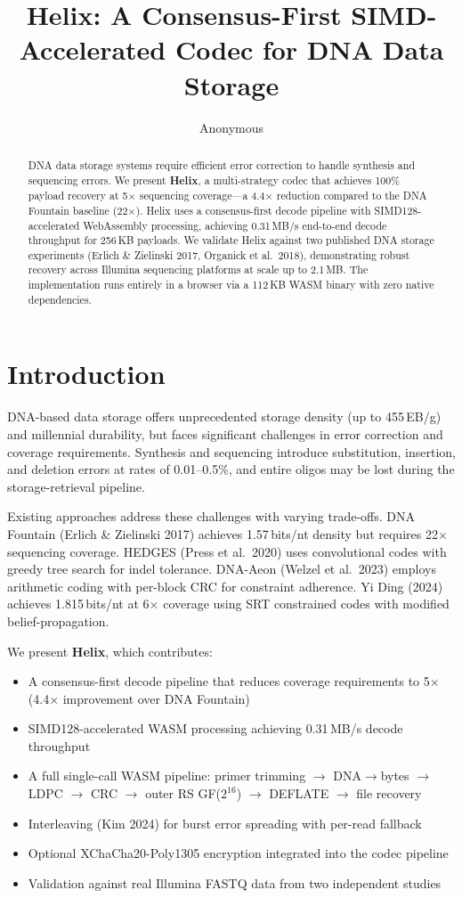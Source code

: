 \documentclass[11pt,a4paper]{article}
\title{\textbf{Helix: A Consensus-First SIMD-Accelerated Codec for DNA Data Storage}}
\author{Anonymous}
\date{}
\begin{document}
\maketitle

\begin{abstract}
DNA data storage systems require efficient error correction to handle synthesis and sequencing errors. We present \textbf{Helix}, a multi-strategy codec that achieves 100\% payload recovery at 5$\times$ sequencing coverage---a 4.4$\times$ reduction compared to the DNA Fountain baseline (22$\times$). Helix uses a consensus-first decode pipeline with SIMD128-accelerated WebAssembly processing, achieving 0.31\,MB/s end-to-end decode throughput for 256\,KB payloads. We validate Helix against two published DNA storage experiments (Erlich \& Zielinski 2017, Organick et al.\ 2018), demonstrating robust recovery across Illumina sequencing platforms at scale up to 2.1\,MB. The implementation runs entirely in a browser via a 112\,KB WASM binary with zero native dependencies.
\end{abstract}

\section{Introduction}

DNA-based data storage offers unprecedented storage density (up to 455\,EB/g) and millennial durability, but faces significant challenges in error correction and coverage requirements. Synthesis and sequencing introduce substitution, insertion, and deletion errors at rates of 0.01--0.5\%, and entire oligos may be lost during the storage-retrieval pipeline.

Existing approaches address these challenges with varying trade-offs. DNA Fountain (Erlich \& Zielinski 2017) achieves 1.57\,bits/nt density but requires 22$\times$ sequencing coverage. HEDGES (Press et al.\ 2020) uses convolutional codes with greedy tree search for indel tolerance. DNA-Aeon (Welzel et al.\ 2023) employs arithmetic coding with per-block CRC for constraint adherence. Yi Ding (2024) achieves 1.815\,bits/nt at 6$\times$ coverage using SRT constrained codes with modified belief-propagation.

We present \textbf{Helix}, which contributes:
\begin{itemize}[noitemsep]
\item A consensus-first decode pipeline that reduces coverage requirements to 5$\times$ (4.4$\times$ improvement over DNA Fountain)
\item SIMD128-accelerated WASM processing achieving 0.31\,MB/s decode throughput
\item A full single-call WASM pipeline: primer trimming $\to$ DNA$\to$bytes $\to$ LDPC $\to$ CRC $\to$ outer RS GF($2^{16}$) $\to$ DEFLATE $\to$ file recovery
\item Interleaving (Kim 2024) for burst error spreading with per-read fallback
\item Optional XChaCha20-Poly1305 encryption integrated into the codec pipeline
\item Validation against real Illumina FASTQ data from two independent studies
\end{itemize}
\end{document}
